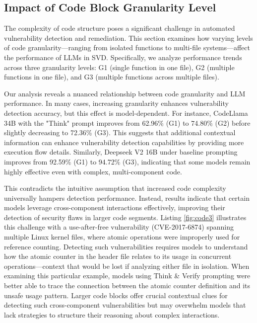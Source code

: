\documentclass[sigconf]{acmart}
\begin{document}
\subsection{Impact of Code Block Granularity Level}

The complexity of code structure poses a significant challenge in automated vulnerability detection and remediation. This section examines how varying levels of code granularity—ranging from isolated functions to multi-file systems—affect the performance of LLMs in SVD. Specifically, we analyze performance trends across three granularity levels: G1 (single function in one file), G2 (multiple functions in one file), and G3 (multiple functions across multiple files).

Our analysis reveals a nuanced relationship between code granularity and LLM performance. In many cases, increasing granularity enhances vulnerability detection accuracy, but this effect is model-dependent. For instance, CodeLlama 34B with the "Think" prompt improves from 62.96\% (G1) to 74.80\% (G2) before slightly decreasing to 72.36\% (G3). This suggests that additional contextual information can enhance vulnerability detection capabilities by providing more execution flow details. Similarly, Deepseek V2 16B under baseline prompting improves from 92.59\% (G1) to 94.72\% (G3), indicating that some models remain highly effective even with complex, multi-component code.

This contradicts the intuitive assumption that increased code complexity universally hampers detection performance. Instead, results indicate that certain models leverage cross-component interactions effectively, improving their detection of security flaws in larger code segments. Listing \ref{fig:code3} illustrates this challenge with a use-after-free vulnerability (CVE-2017-6874) spanning multiple Linux kernel files, where atomic operations were improperly used for reference counting. Detecting such vulnerabilities requires models to understand how the atomic counter in the header file relates to its usage in concurrent operations—context that would be lost if analyzing either file in isolation. When examining this particular example, models using Think \& Verify prompting were better able to trace the connection between the atomic counter definition and its unsafe usage pattern. Larger code blocks offer crucial contextual clues for detecting such cross-component vulnerabilities but may overwhelm models that lack strategies to structure their reasoning about complex interactions.
\end{document}
